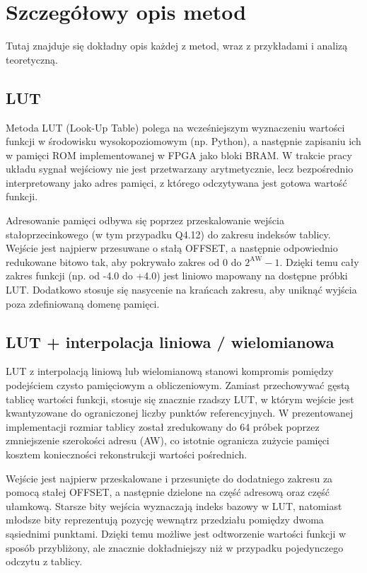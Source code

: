 \documentclass[12pt, a4paper, oneside]{scrreprt}
\begin{document}
\chapter{Szczegółowy opis metod}
Tutaj znajduje się dokładny opis każdej z metod, wraz z przykładami i analizą teoretyczną.

\section{LUT}

Metoda LUT (Look-Up Table) polega na wcześniejszym wyznaczeniu wartości funkcji
w środowisku wysokopoziomowym (np. Python), a następnie zapisaniu ich w pamięci
ROM implementowanej w FPGA jako bloki BRAM. W trakcie pracy układu sygnał wejściowy
nie jest przetwarzany arytmetycznie, lecz bezpośrednio interpretowany jako adres pamięci,
z którego odczytywana jest gotowa wartość funkcji.

Adresowanie pamięci odbywa się poprzez przeskalowanie wejścia stałoprzecinkowego
(w tym przypadku Q4.12) do zakresu indeksów tablicy. Wejście jest najpierw przesuwane
o stałą OFFSET, a następnie odpowiednio redukowane bitowo tak, aby pokrywało zakres od 0
do $2^{\text{AW}}-1$. Dzięki temu cały zakres funkcji (np. od -4.0 do +4.0) jest liniowo mapowany
na dostępne próbki LUT. Dodatkowo stosuje się nasycenie na krańcach zakresu, aby uniknąć
wyjścia poza zdefiniowaną domenę pamięci.

\section{LUT + interpolacja liniowa / wielomianowa}

LUT z interpolacją liniową lub wielomianową stanowi kompromis pomiędzy podejściem czysto
pamięciowym a obliczeniowym. Zamiast przechowywać gęstą tablicę wartości funkcji,
stosuje się znacznie rzadszy LUT, w którym wejście jest kwantyzowane do ograniczonej
liczby punktów referencyjnych. W prezentowanej implementacji rozmiar tablicy został zredukowany
do 64 próbek poprzez zmniejszenie szerokości adresu (AW), co istotnie ogranicza zużycie pamięci
kosztem konieczności rekonstrukcji wartości pośrednich.

Wejście jest najpierw przeskalowane i przesunięte do dodatniego zakresu za pomocą stałej
OFFSET, a następnie dzielone na część adresową oraz część ułamkową. Starsze bity wejścia
wyznaczają indeks bazowy w LUT, natomiast młodsze bity reprezentują pozycję wewnątrz
przedziału pomiędzy dwoma sąsiednimi punktami. Dzięki temu możliwe jest odtworzenie
wartości funkcji w sposób przybliżony, ale znacznie dokładniejszy niż w przypadku
pojedynczego odczytu z tablicy.
\end{document}
